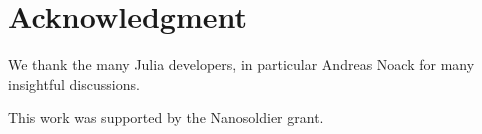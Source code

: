 \documentclass[conference]{IEEEtran}
\begin{document}


\section*{Acknowledgment}

We thank the many Julia developers, in particular Andreas Noack for many insightful discussions.

This work was supported by the Nanosoldier grant.




\end{document}

